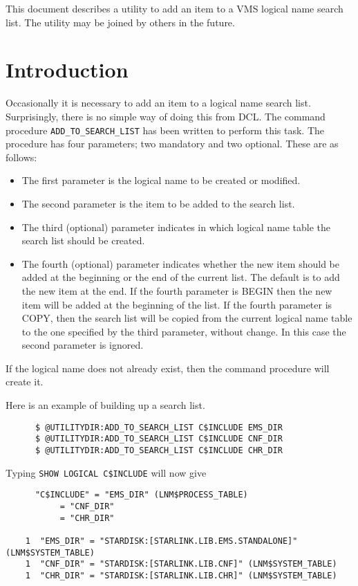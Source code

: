 This document describes a utility to add an item to a VMS logical name search
list. The utility may be joined by others in the future.

\section{Introduction}

Occasionally it is necessary to add an item to a logical name search list.
Surprisingly, there is no simple way of doing this from DCL. The command
procedure {\tt ADD\_TO\_SEARCH\_LIST} has been written to perform this task.
The procedure has four parameters; two mandatory and two optional. These are as
follows:

\begin{itemize}
\item The first parameter is the logical name to be created or modified.
\item The second parameter is the item to be added to the search list.
\item The third (optional) parameter indicates in which logical name table the
search list should be created.
\item The fourth (optional) parameter indicates whether the new item should be
added at the beginning or the end of the current list. The default is to add
the new item at the end. If the fourth parameter is BEGIN then the new item
will be added at the beginning of the list. If the fourth parameter is COPY,
then the search list will be copied from the current logical name table to the
one specified by the third parameter, without change. In this case the second
parameter is ignored.
\end{itemize}

If the logical name does not already exist, then the command procedure will
create it.

Here is an example of building up a search list.

\begin{verbatim}
      $ @UTILITYDIR:ADD_TO_SEARCH_LIST C$INCLUDE EMS_DIR
      $ @UTILITYDIR:ADD_TO_SEARCH_LIST C$INCLUDE CNF_DIR
      $ @UTILITYDIR:ADD_TO_SEARCH_LIST C$INCLUDE CHR_DIR
\end{verbatim}

Typing {\tt SHOW LOGICAL C\$INCLUDE}  will now give

\begin{verbatim}
      "C$INCLUDE" = "EMS_DIR" (LNM$PROCESS_TABLE)
           = "CNF_DIR"
           = "CHR_DIR"

    1  "EMS_DIR" = "STARDISK:[STARLINK.LIB.EMS.STANDALONE]" (LNM$SYSTEM_TABLE)
    1  "CNF_DIR" = "STARDISK:[STARLINK.LIB.CNF]" (LNM$SYSTEM_TABLE)
    1  "CHR_DIR" = "STARDISK:[STARLINK.LIB.CHR]" (LNM$SYSTEM_TABLE)
\end{verbatim}

